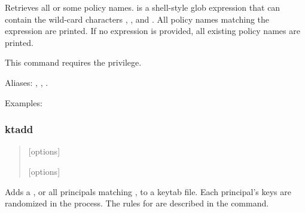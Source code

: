 \documentclass[letterpaper,10pt,english]{sphinxmanual}
\begin{document}
Retrieves all or some policy names.   is a shell-style
glob expression that can contain the wild-card characters ,
\sphinxcode{*}, and \sphinxcode{{[}{]}}.  All policy names matching the expression are
printed.  If no expression is provided, all existing policy names are
printed.

This command requires the  privilege.

Aliases: , , .

Examples:

%
\begin{sphinxVerbatim}[commandchars=\\\{\}]
  

   
\end{sphinxVerbatim}
\label{\detokenize{admin/admin_commands/kadmin_local:list-policies-end}}

\subsubsection{ktadd}
\label{\detokenize{admin/admin_commands/kadmin_local:ktadd}}\label{\detokenize{admin/admin_commands/kadmin_local:list-policies-end}}\label{\detokenize{admin/admin_commands/kadmin_local:id17}}\begin{quote}

\begin{DUlineblock}{0em}
\item[]  {[}options{]} 
\item[]  {[}options{]}  
\end{DUlineblock}
\end{quote}

Adds a , or all principals matching , to a
keytab file.  Each principal’s keys are randomized in the process.
The rules for  are described in the 
command.
\end{document}
